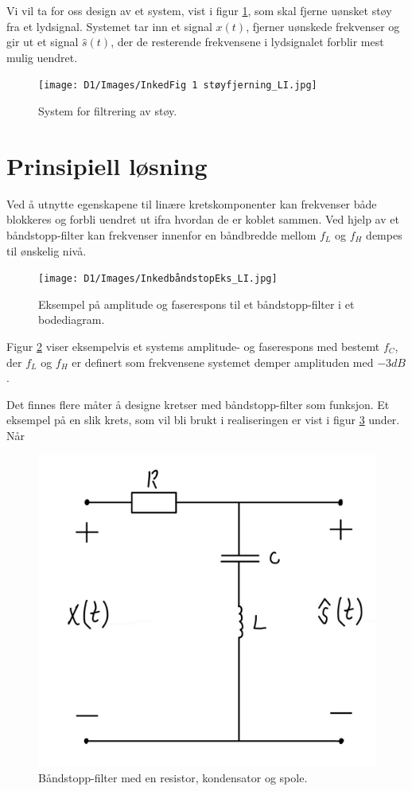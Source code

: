 \documentclass[a4paper,11pt,norsk]{article}
\begin{document}
Vi vil ta for oss design av et system, vist i figur \ref{fig:1}, som skal fjerne uønsket støy fra et lydsignal. Systemet tar inn et signal $x(t)$, fjerner uønskede frekvenser  og gir ut et signal $\hat{s}(t)$, der de resterende frekvensene i lydsignalet forblir mest mulig uendret. 

\begin{figure}[H]
  \centering
  \texttt{[image: D1/Images/InkedFig 1 støyfjerning\_LI.jpg]}
  \caption{System for filtrering av støy.}
  \label{fig:1}
\end{figure}

\section{Prinsipiell løsning}
\label{sec:prinsipielllosning}

Ved å utnytte egenskapene til linære kretskomponenter kan frekvenser både blokkeres og forbli uendret ut ifra hvordan de er koblet sammen. Ved hjelp av et båndstopp-filter kan frekvenser innenfor en båndbredde mellom $f_{L}$ og $f_H$ dempes til ønskelig nivå.  

\begin{figure}[H]
  \centering
  \texttt{[image: D1/Images/InkedbåndstopEks\_LI.jpg]}
  \caption{Eksempel på amplitude og faserespons til et båndstopp-filter i et bodediagram.}
  \label{fig:2}
\end{figure}

Figur \ref{fig:2} viser eksempelvis et systems amplitude- og faserespons med bestemt $f_C$, der $f_L$ og $f_H$ er definert som frekvensene systemet demper amplituden med $-3 dB$.

Det finnes flere måter å designe kretser med båndstopp-filter som funksjon. Et eksempel på en slik krets, som vil bli brukt i realiseringen er vist i figur \ref{fig:3} under. Når 

\begin{figure}[H]
  \centering
  \includegraphics[scale=0.2]{D1/Images/IMG_E0537.JPG}
  \caption{Båndstopp-filter med en resistor, kondensator og spole.}
  \label{fig:3}
\end{figure}
\end{document}

